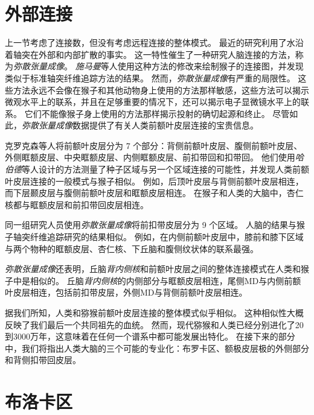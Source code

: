 \section{外部连接}

上一节考虑了连接数，但没有考虑远程连接的整体模式。
最近的研究利用了水沿着轴突在外部和内部扩散的事实。
这一特性催生了一种研究人脑连接的方法，称为\textit{弥散张量成像}。
\textit{施马曼}等人\cite{schmahmann2007association}使用这种方法的修改来绘制猴子的连接图，并发现类似于标准轴突纤维追踪方法的结果。
然而，\textit{弥散张量成像}有严重的局限性。
这些方法永远不会像在猴子和其他动物身上使用的方法那样敏感，这些方法可以揭示微观水平上的联系，并且在足够重要的情况下，还可以揭示电子显微镜水平上的联系。
它们不能像猴子身上使用的方法那样揭示投射的确切起源和终止。
尽管如此，\textit{弥散张量成像}数据提供了有关人类前额叶皮层连接的宝贵信息。
\par


克罗克森等人\cite{croxson2005quantitative}将前额叶皮层分为 7 个部分：背侧前额叶皮层、腹侧前额叶皮层、外侧眶额皮层、中央眶额皮层、内侧眶额皮层、前扣带回和扣带回。
他们使用\textit{哈伯德}等人\cite{hubbard2005interactions}设计的方法测量了种子区域与另一个区域连接的可能性，并发现人类前额叶皮层连接的一般模式与猴子相似。
例如，后顶叶皮层与背侧前额叶皮层相连，而下层颞皮层与腹侧前额叶皮层和眶额皮层相连。
在猴子和人类的大脑中，杏仁核都与眶额皮层和前扣带回皮层相连。
\par


同一组研究人员使用\textit{弥散张量成像}将前扣带皮层分为 9 个区域\cite{beckmann2009connectivity}。
人脑的结果与猴子轴突纤维追踪研究的结果相似\cite{carmichael1994architectonic}。
例如，在内侧前额叶皮层中，膝前和膝下区域与两个物种的眶额皮层、杏仁核、下丘脑和腹侧纹状体的联系最强。
\par


\textit{弥散张量成像}还表明，丘脑\textit{背内侧核}和前额叶皮层之间的整体连接模式在人类和猴子中是相似的\cite{klein2010topography}。
丘脑\textit{背内侧核}的内侧部分与眶额皮层相连，尾侧MD与内侧前额叶皮层相连，包括前扣带皮层，外侧MD与背侧前额叶皮层相连。
\par


据我们所知，人类和猕猴前额叶皮层连接的整体模式似乎相似。
这种相似性大概反映了我们最后一个共同祖先的血统。
然而，现代猕猴和人类已经分别进化了20到3000万年，这意味着在任何一个谱系中都可能发展出特化。
在接下来的部分中，我们将指出人类大脑的三个可能的专业化：布罗卡区、额极皮层极的外侧部分和背侧扣带回皮层。



\section{布洛卡区}

